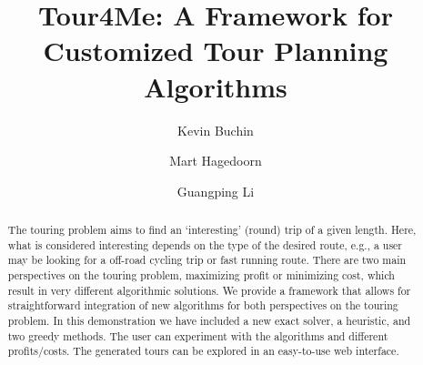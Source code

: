 \documentclass[sigconf,natbib=false]{acmart}
\begin{document}
\title{Tour4Me: A Framework for Customized Tour Planning Algorithms}


\author{Kevin Buchin}

\author{Mart Hagedoorn}

\author{Guangping Li}

\renewcommand{\shortauthors}{Buchin, Hagedoorn, and Li}
\newcommand{\tG}{\textsc{Tour4Me}\xspace}

\begin{abstract}
The touring problem aims to find an `interesting' (round) trip of a given length. Here, what is considered interesting depends on the type of the desired route, e.g., a user may be looking for a off-road cycling trip or fast running route.
There are two main perspectives on the touring problem, maximizing profit or minimizing cost, which result in very different algorithmic solutions. We provide a framework that allows for straightforward integration of new algorithms for both perspectives on the touring problem.
In this demonstration we have included a new exact solver, a heuristic, and two greedy methods. The user can experiment with the algorithms and different profits/costs. The generated tours can be explored in an easy-to-use web interface.
\end{abstract}
\end{document}
